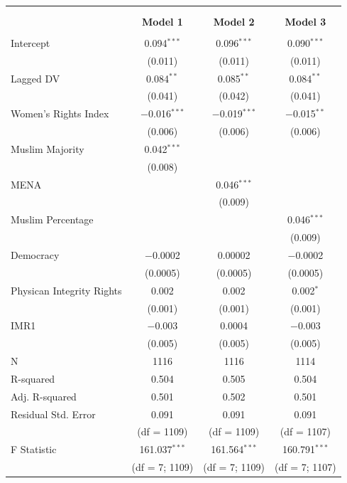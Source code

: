 \documentclass[11pt, oneside]{article}
\begin{document}
\begin{table}[!htbp] \centering 
  \caption{} 
  \label{} 
\begin{tabular}{@{\extracolsep{5pt}}lccc} 
\\[-1.8ex]\hline \\[-1.8ex] 
\\[-1.8ex] & \textbf{Model 1} & \textbf{Model 2} & \textbf{Model 3}\\ 
\hline \\[-1.8ex] 
 Intercept & 0.094$^{***}$ & 0.096$^{***}$ & 0.090$^{***}$ \\ 
  & (0.011) & (0.011) & (0.011) \\ 
  Lagged DV & 0.084$^{**}$ & 0.085$^{**}$ & 0.084$^{**}$ \\ 
  & (0.041) & (0.042) & (0.041) \\ 
  Women's Rights Index & $-$0.016$^{***}$ & $-$0.019$^{***}$ & $-$0.015$^{**}$ \\ 
  & (0.006) & (0.006) & (0.006) \\ 
  Muslim Majority & 0.042$^{***}$ &  &  \\ 
  & (0.008) &  &  \\ 
  MENA &  & 0.046$^{***}$ &  \\ 
  &  & (0.009) &  \\ 
  Muslim Percentage &  &  & 0.046$^{***}$ \\ 
  &  &  & (0.009) \\ 
  Democracy & $-$0.0002 & 0.00002 & $-$0.0002 \\ 
  & (0.0005) & (0.0005) & (0.0005) \\ 
  Physican Integrity Rights & 0.002 & 0.002 & 0.002$^{*}$ \\ 
  & (0.001) & (0.001) & (0.001) \\ 
  IMR1 & $-$0.003 & 0.0004 & $-$0.003 \\ 
  & (0.005) & (0.005) & (0.005) \\ 
 N & 1116 & 1116 & 1114 \\ 
R-squared & 0.504 & 0.505 & 0.504 \\ 
Adj. R-squared & 0.501 & 0.502 & 0.501 \\ 
Residual Std. Error & 0.091  & 0.091  & 0.091\\ 
 & (df = 1109) & (df = 1109) &  (df = 1107)  \\
F Statistic & 161.037$^{***}$ & 161.564$^{***}$  & 160.791$^{***}$  \\ 
  & (df = 7; 1109) & (df = 7; 1109) & (df = 7; 1107) \\ 


\end{tabular}
\end{table}
\end{document}
